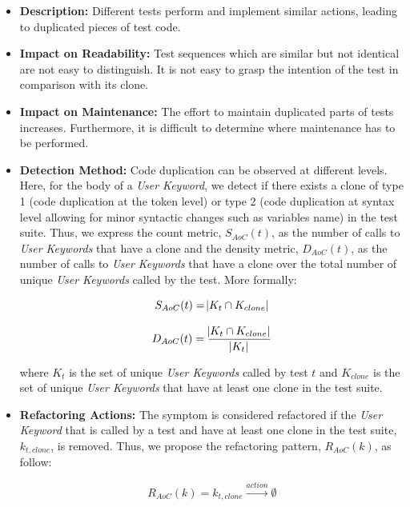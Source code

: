 \begin{itemize}
    \item \textbf{Description:} Different tests perform and implement similar actions, leading to duplicated pieces of test code.
    
    \item \textbf{Impact on Readability:} Test sequences which are similar but not identical are not easy to distinguish. It is not easy to grasp the intention of the test in comparison with its clone.
    
    \item \textbf{Impact on Maintenance:} The effort to maintain duplicated parts of tests increases. Furthermore, it is difficult to determine where maintenance has to be performed.
    
    \item \textbf{Detection Method:} Code duplication can be observed at different levels. Here, for the body of a \emph{User Keyword}, we detect if there exists a clone of type 1 (code duplication at the token level) or type 2 (code duplication at syntax level allowing for minor syntactic changes such as variables name) in the test suite. Thus, we express the count metric, $S_{AoC}(t)$, as the number of calls to \emph{User Keywords} that have a clone and the density metric, $D_{AoC}(t)$, as the number of calls to \emph{User Keywords} that have a clone over the total number of unique \emph{User Keywords} called by the test. More formally:

    \begin{equation*}
        S_{AoC}(t) = \abs{K_t \cap K_{clone}} 
    \end{equation*}
    
    \begin{equation*}
        D_{AoC}(t) = \frac{\abs{K_t \cap K_{clone}}}{\abs{K_{t}}}
    \end{equation*}
    
    where $K_{t}$ is the set of unique \emph{User Keywords} called by test $t$ and $K_{clone}$ is the set of unique \emph{User Keywords} that have at least one clone in the test suite.
    
    \item \textbf{Refactoring Actions:} The symptom is considered refactored if the \emph{User Keyword} that is called by a test  and have at least one clone in the test suite, $k_{t, clone}$, is removed. Thus, we propose the refactoring pattern, $R_{AoC}(k)$, as follow:

    \begin{equation*}
        R_{AoC}(k) = k_{t, clone} \xrightarrow{action} \emptyset
    \end{equation*}
\end{itemize}

